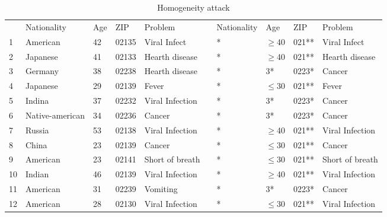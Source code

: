 \documentclass{llncs}
\begin{document}
\begin{table}[]
	\centering
	\caption{Homogeneity attack}
	\label{homogenityattack}
	\begin{tabular}{@{}llllllllll@{}}
		\cmidrule(lr){2-5} \cmidrule(l){7-10}
		& Nationality     & Age & ZIP   & Problem         &  & Nationality & Age      & ZIP   & Problem         \\ \cmidrule(lr){2-5} \cmidrule(l){7-10} 
		1  & American        & 42  & 02135 & Viral Infect    &  & *           & $\geq$40 & 021** & Viral Infect    \\
		2  & Japanese        & 41  & 02133 & Hearth disease  &  & *           & $\geq$40 & 021** & Hearth disease  \\
		3  & Germany         & 38  & 02238 & Hearth disease  &  & *           & 3*       & 0223* & Cancer          \\
		4  & Japanese        & 29  & 02139 & Fever           &  & *           & $\leq$30 & 021** & Fever           \\
		5  & Indina          & 37  & 02232 & Viral Infection &  & *           & 3*       & 0223* & Cancer          \\
		6  & Native-american & 34  & 02236 & Cancer          &  & *           & 3*       & 0223* & Cancer          \\
		7  & Russia          & 53  & 02138 & Viral Infection &  & *           & $\geq$40 & 021** & Viral Infection \\
		8  & China           & 23  & 02139 & Cancer          &  & *           & $\leq$30 & 021** & Cancer          \\
		9  & American        & 23  & 02141 & Short of breath &  & *           & $\leq$30 & 021** & Short of breath \\
		10 & Indian          & 46  & 02139 & Viral Infection &  & *           & $\geq$40 & 021** & Viral Infection \\
		11 & American        & 31  & 02239 & Vomiting        &  & *           & 3*       & 0223* & Cancer          \\
		12 & American        & 28  & 02130 & Viral Infection &  & *           & $\leq$30 & 021** & Viral Infection \\ \cmidrule(lr){2-5} \cmidrule(l){7-10} 
	\end{tabular}
\end{table}
\end{document}
